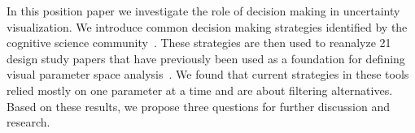 In this position paper we investigate the role of decision 
making in uncertainty visualization.
We introduce common decision making strategies identified by the cognitive science 
community~\citep{Payne:1993}. These strategies are then used  to reanalyze 
21 design study papers that have previously been used as a foundation for
defining visual parameter space analysis~\citep{Sedlmair:2014}. 
We found that current strategies in these tools relied mostly on
one parameter at a time and are about filtering alternatives.
Based on these results, we  propose three questions for further discussion and research.

